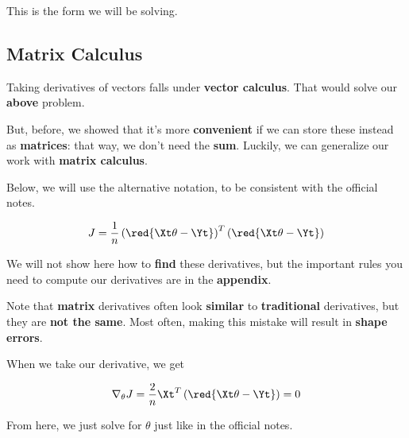         
        This is the form we will be solving. 
        
    \subsection*{Matrix Calculus}
    
        Taking derivatives of vectors falls under \textbf{vector calculus}. That would solve our \textbf{above} problem.
        
        But, before, we showed that it's more \textbf{convenient} if we can store these instead as \textbf{matrices}: that way, we don't need the \textbf{sum}. Luckily, we can generalize our work with \textbf{matrix calculus}. 
        
        Below, we will use the alternative notation, to be consistent with the official notes.
        
        \begin{equation}
            J = \frac{1}{n}
                \left( \red{ \Xt \theta  - \Yt } \right)^T
                \left( \red{ \Xt \theta  - \Yt } \right) 
        \end{equation}
        
        We will not show here how to \textbf{find} these derivatives, but the important rules you need to compute our derivatives are in the \textbf{appendix}.
        
        Note that \textbf{matrix} derivatives often look \textbf{similar} to \textbf{traditional} derivatives, but they are \textbf{not the same}. Most often, making this mistake will result in \textbf{shape errors}.
        
        When we take our derivative, we get
        
        \begin{equation}
            \nabla_\theta J = 
                \frac{2}{n} \Xt^T
                \left( \red{ \Xt \theta  - \Yt } \right) 
            =0
        \end{equation}
        
        From here, we just solve for $\theta$ just like in the official notes.\\
        
